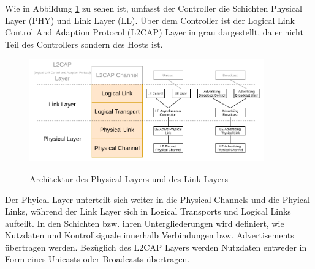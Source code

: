 Wie in Abbildung \ref{fig: controller architektur} zu sehen ist, umfasst der Controller die Schichten Physical Layer (PHY) und Link Layer (LL). Über dem Controller ist der Logical Link Control And Adaption Protocol (L2CAP) Layer in grau dargestellt, da er nicht Teil des Controllers sondern des Hosts ist.

\begin{figure}[H]
    \centering
    \includegraphics[width=0.9\textwidth]{graphics/controller_layers.pdf}
    \caption[Architektur des Physical Layers und des Link Layers]{Architektur des Physical Layers und des Link Layers \cite{BtSpec4.0_fig_145}} \cite{BtSpec4.0_fig_151}
    \label{fig: controller architektur}
\end{figure}

Der Phyical Layer unterteilt sich weiter in die Physical Channels und die Phyical Links, während der Link Layer sich in Logical Transports und Logical Links aufteilt. In den Schichten bzw. ihren Untergliederungen wird definiert, wie Nutzdaten und Kontrollsignale innerhalb Verbindungen bzw. Advertisements übertragen werden. Bezüglich des L2CAP Layers werden Nutzdaten entweder in Form eines Unicasts oder Broadcasts übertragen.